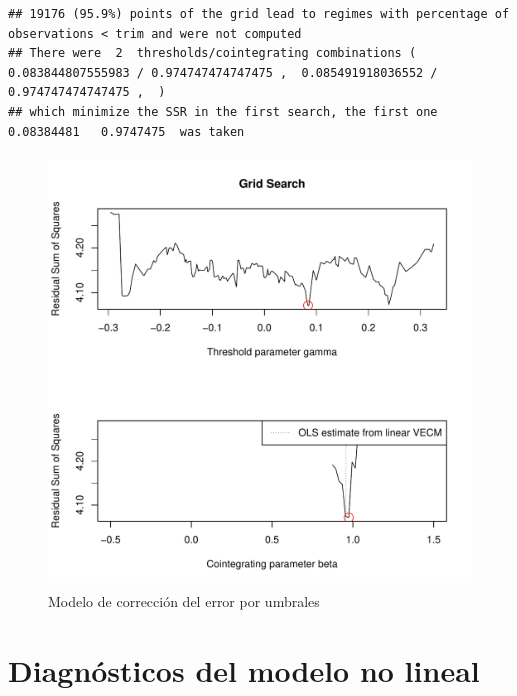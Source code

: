 \documentclass[12pt, twoside]{book}\usepackage[]{graphicx}\usepackage[]{color}
\makeatletter
\newenvironment{kframe}{%
 \def\at@end@of@kframe{}%
 \ifinner\ifhmode%
  \def\at@end@of@kframe{\end{minipage}}%
  \begin{minipage}{\columnwidth}%
 \fi\fi%
 \def\FrameCommand##1{\hskip\@totalleftmargin \hskip-\fboxsep
 \colorbox{shadecolor}{##1}\hskip-\fboxsep
     \hskip-\linewidth \hskip-\@totalleftmargin \hskip\columnwidth}%
 \MakeFramed {\advance\hsize-\width
   \@totalleftmargin\z@ \linewidth\hsize
   \@setminipage}}%
 {\par\unskip\endMakeFramed%
 \at@end@of@kframe}
\newenvironment{knitrout}{}{} %
\numberwithin{equation}{section}
\numberwithin{theorem}{section}
\numberwithin{teorema}{section}
\numberwithin{defi}{section}
\numberwithin{prop}{section}
\numberwithin{defi}{section}
\theoremstyle{plain}
\makeatother
\begin{document}
\begin{knitrout}
\color{fgcolor}\begin{kframe}
\begin{verbatim}
## 19176 (95.9%) points of the grid lead to regimes with percentage of observations < trim and were not computed
## There were  2  thresholds/cointegrating combinations ( 0.083844807555983 / 0.974747474747475 ,  0.085491918036552 / 0.974747474747475 ,  ) 
## which minimize the SSR in the first search, the first one  0.08384481   0.9747475  was taken
\end{verbatim}
\end{kframe}\begin{figure}[H]

{\centering \includegraphics[width=4.5in,height=4.5in]{figure/fig-5_9-1} 

}

\caption[Modelo de corrección del error por umbrales]{Modelo de corrección del error por umbrales}\label{fig:fig-5.9}
\end{figure}


\end{knitrout}

\section{Diagnósticos del modelo no lineal}
\end{document}
